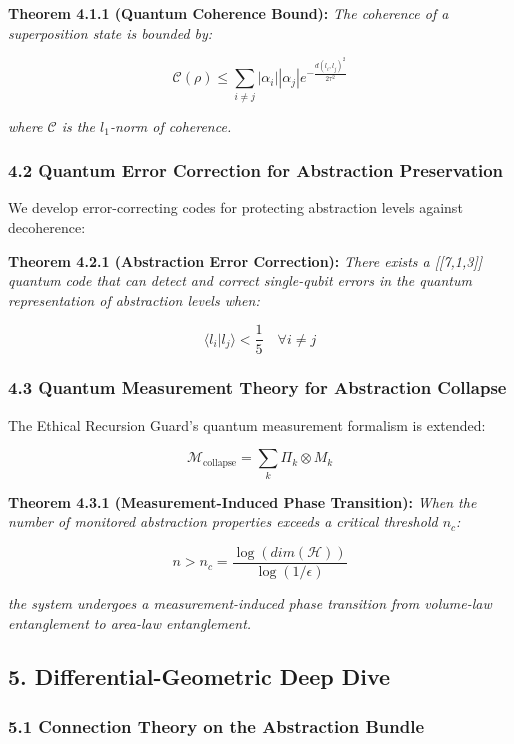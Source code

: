 \documentclass[
]{article}
\begin{document}
\textbf{Theorem 4.1.1 (Quantum Coherence Bound):} \emph{The coherence of
a superposition state is bounded by:}

\[\mathcal{C}(\rho) \leq \sum_{i \neq j} |\alpha_i||\alpha_j| e^{-\frac{d(l_i,l_j)^2}{2\tau^2}}\]

\emph{where \(\mathcal{C}\) is the \(l_1\)-norm of coherence.}

\subsubsection{4.2 Quantum Error Correction for Abstraction
Preservation}\label{quantum-error-correction-for-abstraction-preservation}

We develop error-correcting codes for protecting abstraction levels
against decoherence:

\textbf{Theorem 4.2.1 (Abstraction Error Correction):} \emph{There
exists a {[}{[}7,1,3{]}{]} quantum code that can detect and correct
single-qubit errors in the quantum representation of abstraction levels
when:}

\[\langle l_i | l_j \rangle < \frac{1}{5} \quad \forall i \neq j\]

\subsubsection{4.3 Quantum Measurement Theory for Abstraction
Collapse}\label{quantum-measurement-theory-for-abstraction-collapse}

The Ethical Recursion Guard's quantum measurement formalism is extended:

\[\mathcal{M}_{\text{collapse}} = \sum_k \Pi_k \otimes M_k\]

\textbf{Theorem 4.3.1 (Measurement-Induced Phase Transition):}
\emph{When the number of monitored abstraction properties exceeds a
critical threshold \(n_c\):}

\[n > n_c = \frac{\log(dim(\mathcal{H}))}{\log(1/\epsilon)}\]

\emph{the system undergoes a measurement-induced phase transition from
volume-law entanglement to area-law entanglement.}

\subsection{5. Differential-Geometric Deep
Dive}\label{differential-geometric-deep-dive}

\subsubsection{5.1 Connection Theory on the Abstraction
Bundle}\label{connection-theory-on-the-abstraction-bundle}
\end{document}
